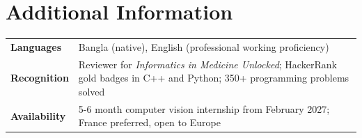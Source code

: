 \documentclass[10pt,a4paper]{article}
\begin{document}
\section{Additional Information}
\begin{tabularx}{\textwidth}{@{}>{\bfseries}l X@{}}
Languages & Bangla (native), English (professional working proficiency) \\
Recognition & Reviewer for \textit{Informatics in Medicine Unlocked}; HackerRank gold badges in C++ and Python; 350+ programming problems solved \\
Availability & 5-6 month computer vision internship from February 2027; France preferred, open to Europe \\
\end{tabularx}
\end{document}
